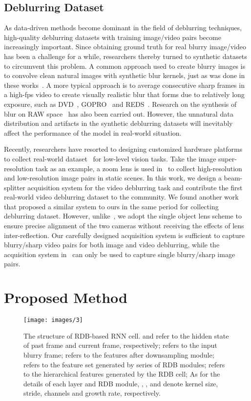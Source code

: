 \documentclass[twocolumn]{svjour3}          \smartqed  \usepackage{graphicx}
\begin{document}
\subsection{Deblurring Dataset}
\label{sec:related_dataset}
As data-driven methods become dominant in the field of deblurring techniques, high-quality deblurring datasets with training image/video pairs become increasingly important. Since obtaining ground truth for real blurry image/video has been a challenge for a while, researchers thereby turned to synthetic datasets to circumvent this problem. A common approach used to create blurry images is to convolve clean natural images with synthetic blur kernels, just as was done in these works~\cite{xu2014deep, sun2015learning, chakrabarti2016neural, kupyn2018deblurgan}. A more typical approach is to average consecutive sharp frames in a high-fps video to create visually realistic blur that forms due to relatively long exposure, such as DVD~\cite{su2017deep}, GOPRO~\cite{nah2017deep} and REDS~\cite{nah2019ntire}. Research on the synthesis of blur on RAW space~\cite{cao2022towards} has also been carried out. However, the unnatural data distribution and artifacts in the synthetic deblurring datasets will inevitably affect the performance of the model in real-world situation.

Recently, researchers have resorted to designing customized hardware platforms to collect real-world dataset~\cite{zhang2019zoom,zhong2020efficient,rim2020real,zhong2021towards,cao2022learning} for low-level vision tasks. Take the image super-resolution task as an example, a zoom lens is used in~\cite{zhang2019zoom} to collect high-resolution and low-resolution image pairs in static scenes. In this work, we design a beam-splitter acquisition system for the video deblurring task and contribute the first real-world video deblurring dataset to the community. We found another work~\cite{rim2020real} that proposed a similar system to ours in the same period for collecting deblurring dataset. However, unlike~\cite{rim2020real}, we adopt the single object lens scheme to ensure precise alignment of the two cameras without receiving the effects of lens inter-reflection. Our carefully designed acquisition system is sufficient to capture blurry/sharp video pairs for both image and video deblurring, while the acquisition system in~\cite{rim2020real} can only be used to capture single blurry/sharp image pairs.

\section{Proposed Method}
\label{sec:method}
\begin{figure*}[!t]
	\centering
	\texttt{[image: images/3]}
	\caption{The structure of RDB-based RNN cell.  and  refer to the hidden state of past frame and current frame, respectively;  refers to the input blurry frame;  refers to the features after downsampling module;  refers to the feature set generated by series of RDB modules;  refers to the hierarchical features generated by the RDB cell; As for the details of each layer and RDB module, , ,  and  denote kernel size, stride, channels and growth rate, respectively.}
	\label{fig:rdb}
\end{figure*}
\end{document}
